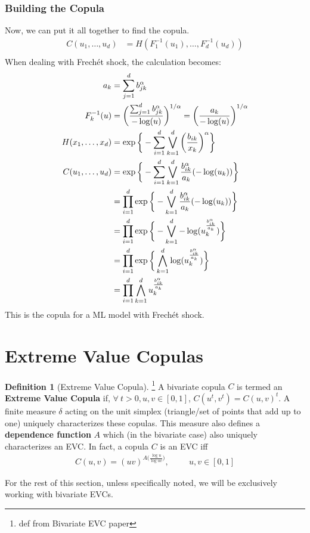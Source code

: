 \documentclass[12pt]{article}
\def\inv{^{-1}}
\newcommand{\ds}{\displaystyle}
\theoremstyle{definition}
\theoremstyle{definition}
\newtheorem{definition}{Definition}
\begin{document}
\subsubsection{Building the Copula}
Now, we can put it all together to find the copula.
\begin{align*}
    C(u_1,\hdots, u_d)&=H(F_1\inv(u_1),\hdots, F_d\inv(u_d))\\
\end{align*}
When dealing with Frechét shock, the calculation becomes:
\begin{align*}
a_k&=\sum_{j=1}^d{b_{jk}^\alpha}\\
F_{k}\inv(u)&=\bigg(\frac{\sum_{j=1}^d{b_{jk}^\alpha}}{-\log(u)} \bigg)^{{1}/{\alpha}}=\bigg(\frac{a_k}{- \log(u)}\bigg)^{1/\alpha}\\
H(x_1,\hdots,x_d)&=\exp\bigg\{ -\sum_{i=1}^d \bigvee_{k=1}^d \bigg( \frac{b_{ik}}{x_k} \bigg)^\alpha \bigg\}\\
     C(u_1,\hdots, u_d)&=\exp\bigg\{ -\sum_{i=1}^d \bigvee_{k=1}^d \frac{b_{ik}^\alpha}{a_k}(-\log(u_k))\bigg\}\\
     &=\prod_{i=1}^d\exp\bigg\{- \bigvee_{k=1}^d \frac{b_{ik}^\alpha}{a_k}(-\log(u_k))\bigg\}\\
     &=\prod_{i=1}^d\exp\bigg\{- \bigvee_{k=1}^d -\log(u_k^\frac{b_{ik}^\alpha}{a_k})\bigg\}\\
     &=\prod_{i=1}^d\exp\bigg\{ \bigwedge_{k=1}^d \log(u_k^\frac{b_{ik}^\alpha}{a_k})\bigg\}\\
     \ds&=\prod_{i=1}^d \bigwedge_{k=1}^d u_k^\frac{b_{ik}^\alpha}{a_k}
\end{align*}
This is the copula for a ML model with Frechét shock.

\section{Extreme Value Copulas}
\begin{definition}[{Extreme Value Copula}]\footnote{def from Bivariate EVC paper}
A bivariate copula $C$ is termed an \textbf{Extreme Value Copula} if, $\forall \ t>0, u,v\in[0,1]$, $C(u^t,v^t)=C(u,v)^t$. A finite measure $\delta$ acting on the unit simplex (triangle/set of points that add up to one) uniquely characterizes these copulas. This measure also defines a \textbf{dependence function} $A$ which (in the bivariate case) also uniquely characterizes an EVC. In fact, a copula $C$ is an EVC iff
\begin{align*}
    C(u,v)=(uv)^{A\big( \frac{\log u}{\log uv} \big)}, \hspace{1cm} u,v\in[0,1]\tag{1}
\end{align*}
\end{definition}
For the rest of this section, unless specifically noted, we will be exclusively working with bivariate EVCs.
\end{document}
